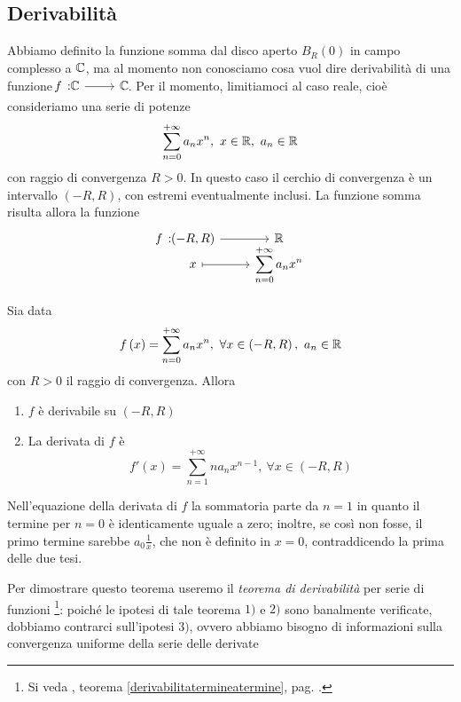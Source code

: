 \subsection{Derivabilità}
Abbiamo definito la funzione somma dal disco aperto $B_R\left(0\right)$ in campo complesso a $\mathbb{C}$, ma al momento non conosciamo cosa vuol dire derivabilità di una funzione $\funz{f}{\complexset}{\complexset}$. Per il momento, limitiamoci al caso reale, cioè consideriamo una serie di potenze
\begin{equation*}
	\sum_{n=0}^{+\infty}a_nx^n,\ x\in\realset,\ a_n\in\realset
\end{equation*}
con raggio di convergenza $R>0$. In questo caso il cerchio di convergenza è un intervallo $\left(-R,R\right)$, con estremi eventualmente inclusi. La funzione somma risulta allora la funzione
\begin{equation}
	\funztot{f}{\left(-R,R\right)}{\realset}{x}{\displaystyle\sum_{n=0}^{+\infty}a_nx^n}
\end{equation}
\begin{theorema}
	Sia data
	\begin{equation*}
		f\left(x\right)=\sum_{n=0}^{+\infty}a_nx^n,\ \forall x\in\left(-R,R\right),\ a_n\in\realset
	\end{equation*}
con $R>0$ il raggio di convergenza. Allora
\begin{enumerate}
	\item $f$ è derivabile su $\left(-R,R\right)$
	\item La derivata di $f$ è
	\begin{equation}
		f'\left(x\right)=\sum_{n=1}^{+\infty}na_nx^{n-1}, \ \forall x\in\left(-R,R\right)
	\end{equation}
\end{enumerate}
\end{theorema}
\begin{observe}
	Nell'equazione della derivata di $f$ la sommatoria parte da $n=1$ in quanto il termine per $n=0$ è identicamente uguale a zero; inoltre, se così non fosse, il primo termine sarebbe $a_0\frac{1}{x}$, che non è definito in $x=0$, contraddicendo la prima delle due tesi.
\end{observe}
Per dimostrare questo teorema useremo il \textit{teorema di derivabilità} per serie di funzioni \footnote{Si veda , teorema \ref{derivabilitatermineatermine}, pag. \pageref{derivabilitatermineatermine}.}: poiché le ipotesi di tale teorema $1)$ e $2)$ sono banalmente verificate, dobbiamo contrarci sull'ipotesi $3)$, ovvero abbiamo bisogno di informazioni sulla convergenza uniforme della serie delle derivate
